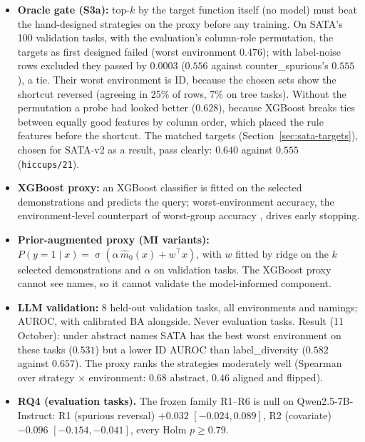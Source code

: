 \documentclass[11pt,a4paper]{article}
\newcommand{\1}{\mathbf{1}}
\DeclareMathOperator{\sigmoid}{\sigma}
\theoremstyle{plain}
\theoremstyle{definition}
\theoremstyle{remark}
\begin{document}
\begin{itemize}[nosep]
  \item \textbf{Oracle gate (S3a):} top-$k$ by the target function itself
        (no model) must beat the hand-designed strategies on the proxy
        before any training. On SATA's 100 validation tasks, with the
        evaluation's column-role permutation, the targets as first designed
        failed (worst environment $0.476$); with label-noise rows excluded
        they passed by $0.0003$ ($0.556$ against counter\_spurious's $0.555$),
        a tie. Their worst environment is ID, because the chosen sets show
        the shortcut reversed (agreeing in 25\% of rows, 7\% on tree tasks).
        Without the permutation a probe had looked better ($0.628$), because
        XGBoost breaks ties between equally good features by column order,
        which placed the rule features before the shortcut. The matched
        targets (Section~\ref{sec:sata-targets}), chosen for SATA-v2 as a
        result, pass clearly: $0.640$ against $0.555$
        (\texttt{hiccups/21}).
  \item \textbf{XGBoost proxy:} an XGBoost classifier
        \citep{chen2016xgboost} is fitted on the selected demonstrations and
        predicts the query; worst-environment accuracy, the environment-level
        counterpart of worst-group accuracy
        \citep{sagawa2020distributionally}, drives early stopping.
  \item \textbf{Prior-augmented proxy (MI variants):}
        $P(y=1 \mid x) = \sigmoid(\alpha\, \hat m_0(x) + w^\top x)$, with $w$
        fitted by ridge on the $k$ selected demonstrations and $\alpha$ on
        validation tasks. The XGBoost proxy cannot see names, so it cannot
        validate the model-informed component.
  \item \textbf{LLM validation:} 8 held-out validation tasks, all
        environments and namings; AUROC, with calibrated BA alongside. Never
        evaluation tasks. Result (11 October): under abstract names SATA has
        the best worst environment on these tasks ($0.531$) but a lower ID
        AUROC than label\_diversity ($0.582$ against $0.657$). The proxy ranks
        the strategies moderately well (Spearman over strategy $\times$
        environment: $0.68$ abstract, $0.46$ aligned and flipped).
  \item \textbf{RQ4 (evaluation tasks).} The frozen family R1--R6 is null on
        Qwen2.5-7B-Instruct: R1 (spurious reversal) $+0.032$ $[-0.024, 0.089]$,
        R2 (covariate) $-0.096$ $[-0.154, -0.041]$, every Holm $p \ge 0.79$.

\end{itemize}
\end{document}
